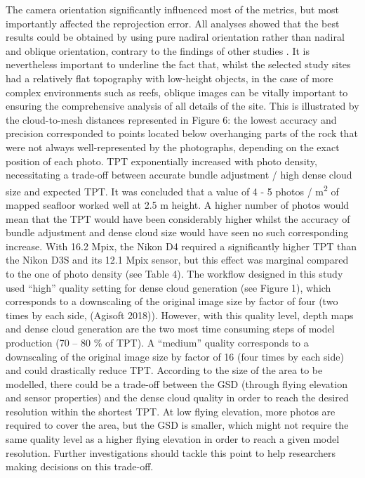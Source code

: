 \medskip
The camera orientation significantly influenced most of the metrics, but most importantly affected the reprojection error. All analyses showed that the best results could be obtained by using pure nadiral orientation rather than nadiral and oblique orientation, contrary to the findings of other studies \citep{chiabrando_influence_2017}. It is nevertheless important to underline the fact that, whilst the selected study sites had a relatively flat topography with low-height objects, in the case of more complex environments such as reefs, oblique images can be vitally important to ensuring the comprehensive analysis of all details of the site. This is illustrated by the cloud-to-mesh distances represented in Figure 6: the lowest accuracy and precision corresponded to points located below overhanging parts of the rock that were not always well-represented by the photographs, depending on the exact position of each photo.
\medskip
TPT exponentially increased with photo density, necessitating a trade-off between accurate bundle adjustment / high dense cloud size and expected TPT. It was concluded that a value of 4 - 5 photos / m\textsuperscript{2} of mapped seafloor worked well at 2.5 m height. A higher number of photos would mean that the TPT would have been considerably higher whilst the accuracy of bundle adjustment and dense cloud size would have seen no such corresponding increase. With 16.2 Mpix, the Nikon D4 required a significantly higher TPT than the Nikon D3S and its 12.1 Mpix sensor, but this effect was marginal compared to the one of photo density (see Table 4).
\medskip
The workflow designed in this study used “high” quality setting for dense cloud generation (see Figure 1), which corresponds to a downscaling of the original image size by factor of four (two times by each side, (Agisoft 2018)). However, with this quality level, depth maps and dense cloud generation are the two most time consuming steps of model production (70 – 80 \% of TPT). A “medium” quality corresponds to a downscaling of the original image size by factor of 16 (four times by each side) and could drastically reduce TPT. According to the size of the area to be modelled, there could be a trade-off between the GSD (through flying elevation and sensor properties) and the dense cloud quality in order to reach the desired resolution within the shortest TPT. At low flying elevation, more photos are required to cover the area, but the GSD is smaller, which might not require the same quality level as a higher flying elevation in order to reach a given model resolution. Further investigations should tackle this point to help researchers making decisions on this trade-off.

